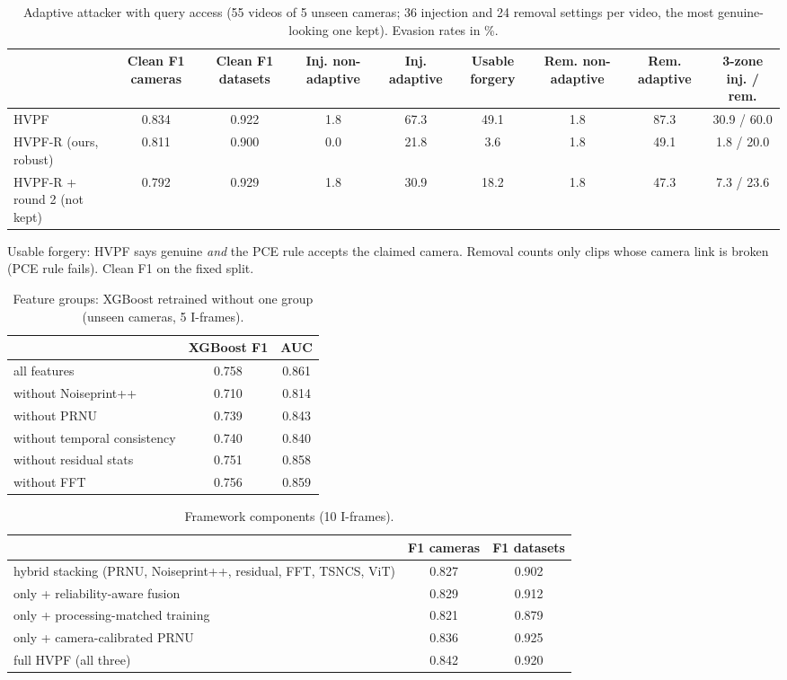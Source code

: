 \begin{table}[t]\centering\small\caption{Adaptive attacker with query access (55 videos of 5 unseen cameras; 36 injection and 24 removal settings per video, the most genuine-looking one kept). Evasion rates in \%.}\label{tab:adaptive}
\begin{tabular}{lcccccccc}
\toprule
 & Clean F1 cameras & Clean F1 datasets & Inj. non-adaptive & Inj. adaptive & Usable forgery & Rem. non-adaptive & Rem. adaptive & 3-zone inj. / rem. \\
\midrule
HVPF & 0.834 & 0.922 & 1.8 & 67.3 & 49.1 & 1.8 & 87.3 & 30.9 / 60.0 \\
HVPF-R (ours, robust) & 0.811 & 0.900 & 0.0 & 21.8 & 3.6 & 1.8 & 49.1 & 1.8 / 20.0 \\
HVPF-R + round 2 (not kept) & 0.792 & 0.929 & 1.8 & 30.9 & 18.2 & 1.8 & 47.3 & 7.3 / 23.6 \\
\bottomrule
\end{tabular}
\par\footnotesize Usable forgery: HVPF says genuine \emph{and} the PCE rule accepts the claimed camera. Removal counts only clips whose camera link is broken (PCE rule fails). Clean F1 on the fixed split.
\end{table}

\begin{table}[t]\centering\small\caption{Feature groups: XGBoost retrained without one group (unseen cameras, 5 I-frames).}\label{tab:abl_feat}
\begin{tabular}{lcc}
\toprule
 & XGBoost F1 & AUC \\
\midrule
all features & 0.758 & 0.861 \\
without Noiseprint++ & 0.710 & 0.814 \\
without PRNU & 0.739 & 0.843 \\
without temporal consistency & 0.740 & 0.840 \\
without residual stats & 0.751 & 0.858 \\
without FFT & 0.756 & 0.859 \\
\bottomrule
\end{tabular}
\end{table}

\begin{table}[t]\centering\small\caption{Framework components (10 I-frames).}\label{tab:abl_comp}
\begin{tabular}{lcc}
\toprule
 & F1 cameras & F1 datasets \\
\midrule
hybrid stacking (PRNU, Noiseprint++, residual, FFT, TSNCS, ViT) & 0.827 & 0.902 \\
  only + reliability-aware fusion & 0.829 & 0.912 \\
  only + processing-matched training & 0.821 & 0.879 \\
  only + camera-calibrated PRNU & 0.836 & 0.925 \\
full HVPF (all three) & 0.842 & 0.920 \\
\bottomrule
\end{tabular}
\end{table}


